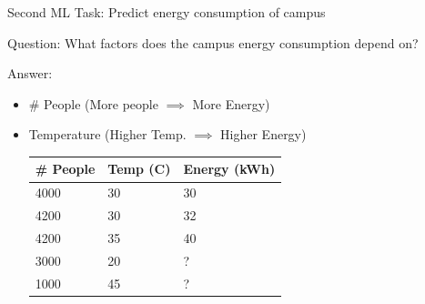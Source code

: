 \documentclass[usenames,dvipsnames]{beamer}
\begin{document}
\begin{frame}{Second ML Task: Predict energy consumption of campus}

Question: What factors does the campus energy consumption depend on?

Answer:\begin{itemize}
	\item \pause \# People (More people $\implies$ More Energy)
	\item \pause Temperature (Higher Temp. $\implies$ Higher Energy)

\pause \begin{table}[]
	\begin{tabular}{|l|l||l|}
		\hline 
		
		\textbf{\# People} & \textbf{Temp (C)} &  \textbf{Energy (kWh)} \\ \hline 
		
		4000 & 30 & 30 \\
		4200 & 30 & 32 \\
		4200 & 35 & 40 \\ \hline
		3000 & 20& ? \\
		1000 & 45 & ? \\ \hline          
	\end{tabular}
\end{table}	
\end{itemize}

\end{frame}
\end{document}
